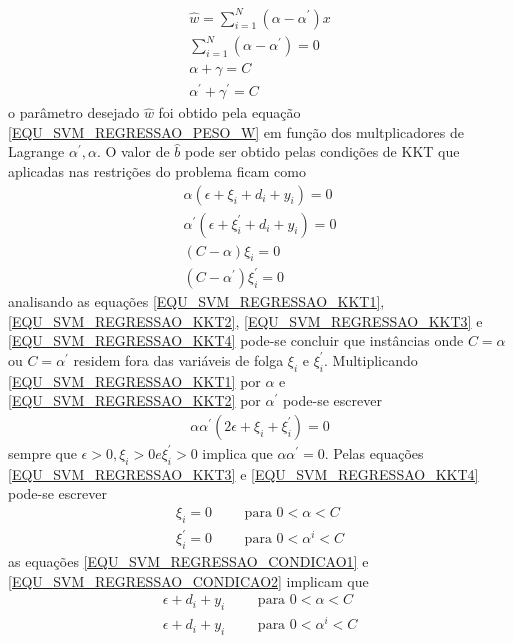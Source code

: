 \begin{align}
\hat{w} = \sum\limits_{i=1}^{N} (\alpha - \alpha^{'})x \label{EQU_SVM_REGRESSAO_PESO_W} \\
\sum\limits_{i=1}^{N} (\alpha - \alpha^{'}) = 0\\
\alpha + \gamma = C\\
\alpha^{'} + \gamma^{'} = C
\end{align}
o parâmetro desejado \(\hat{w}\) foi obtido pela equação \eqref{EQU_SVM_REGRESSAO_PESO_W} em função dos multplicadores de Lagrange \(\alpha^{'}, \alpha\). O valor de \(\hat{b}\) pode ser obtido pelas condições de KKT que aplicadas nas restrições do problema ficam como
\begin{align}
\alpha(\epsilon + \xi_{i} + d_{i} + y_{i}) = 0 \label{EQU_SVM_REGRESSAO_KKT1}\\
\alpha^{'}(\epsilon + \xi_{i}^{'} + d_{i} + y_{i}) = 0 \label{EQU_SVM_REGRESSAO_KKT2}\\
(C-\alpha)\xi_{i} = 0 \label{EQU_SVM_REGRESSAO_KKT3}\\
(C-\alpha^{'})\xi_{i}^{'} = 0 \label{EQU_SVM_REGRESSAO_KKT4}
\end{align}
analisando as equações \eqref{EQU_SVM_REGRESSAO_KKT1}, \eqref{EQU_SVM_REGRESSAO_KKT2}, \eqref{EQU_SVM_REGRESSAO_KKT3} e \eqref{EQU_SVM_REGRESSAO_KKT4} pode-se concluir que instâncias onde \(C=\alpha\) ou \(C=\alpha^{'}\) residem fora das variáveis de folga \(\xi_{i}\) e \(\xi_{i}^{'}\). Multiplicando \eqref{EQU_SVM_REGRESSAO_KKT1} por \(\alpha\) e \eqref{EQU_SVM_REGRESSAO_KKT2} por \(\alpha^{'}\) pode-se escrever
\begin{align}
\alpha\alpha^{'}(2\epsilon + \xi_{i} + \xi_{i}^{'})=0
\end{align}
sempre que \(\epsilon > 0, \xi_{i} > 0 e \xi_{i}^{'} > 0\) implica que \(\alpha\alpha^{'} = 0\). Pelas equações \eqref{EQU_SVM_REGRESSAO_KKT3} e \eqref{EQU_SVM_REGRESSAO_KKT4} pode-se escrever
\begin{align}
\xi_{i}  = 0		\qquad \textrm{ para } 0 < \alpha < C		\label{EQU_SVM_REGRESSAO_CONDICAO1}\\
\xi_{i}^{'} = 0		\qquad \textrm{ para }  0 < \alpha^{i} < C	\label{EQU_SVM_REGRESSAO_CONDICAO2}
\end{align}
as equações \eqref{EQU_SVM_REGRESSAO_CONDICAO1} e \eqref{EQU_SVM_REGRESSAO_CONDICAO2} implicam que  
\begin{align}
\epsilon  + d_{i} + y_{i} 	\qquad \textrm{ para } 0 < \alpha < C				\label{EQU_SVM_REGRESSAO_CONDICAO3}\\
\epsilon  + d_{i} + y_{i}	\qquad \textrm{ para }  0 < \alpha^{i} < C				\label{EQU_SVM_REGRESSAO_CONDICAO4}
\end{align}
